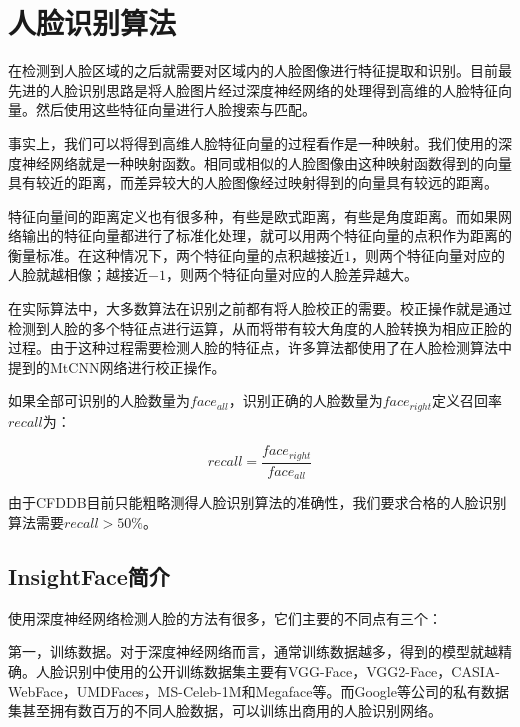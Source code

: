 \chapter{人脸识别算法}
\label{facerecognition}

在检测到人脸区域的之后就需要对区域内的人脸图像进行特征提取和识别。目前最先进的人脸识别思路是将人脸图片经过深度神经网络的处理得到高维的人脸特征向量。然后使用这些特征向量进行人脸搜索与匹配。

事实上，我们可以将得到高维人脸特征向量的过程看作是一种映射。我们使用的深度神经网络就是一种映射函数。相同或相似的人脸图像由这种映射函数得到的向量具有较近的距离，而差异较大的人脸图像经过映射得到的向量具有较远的距离。

特征向量间的距离定义也有很多种，有些是欧式距离，有些是角度距离。而如果网络输出的特征向量都进行了标准化处理，就可以用两个特征向量的点积作为距离的衡量标准。在这种情况下，两个特征向量的点积越接近$1$，则两个特征向量对应的人脸就越相像；越接近$-1$，则两个特征向量对应的人脸差异越大。

在实际算法中，大多数算法在识别之前都有将人脸校正的需要。校正操作就是通过检测到人脸的多个特征点进行运算，从而将带有较大角度的人脸转换为相应正脸的过程。由于这种过程需要检测人脸的特征点，许多算法都使用了在人脸检测算法中提到的MtCNN网络\cite{zhang2016joint}进行校正操作。

如果全部可识别的人脸数量为$face_{all}$，识别正确的人脸数量为$face_{right}$定义召回率$recall$为：

\begin{equation}
\label{eq:rrdef}
recall = \frac{face_{right}}{face_{all}} 
\end{equation}

由于CFDDB目前只能粗略测得人脸识别算法的准确性，我们要求合格的人脸识别算法需要$recall>50\%$。

\section{InsightFace\cite{deng2018arcface}简介}

使用深度神经网络检测人脸的方法有很多，它们主要的不同点有三个：

第一，训练数据。对于深度神经网络而言，通常训练数据越多，得到的模型就越精确。人脸识别中使用的公开训练数据集主要有VGG-Face\cite{parkhi2015deep}，VGG2-Face\cite{cao2017vggface2}，CASIA-WebFace\cite{yi2014learning}，UMDFaces\cite{bansal2017umdfaces}，MS-Celeb-1M\cite{guo2016msceleb}和Megaface\cite{nech2017level}等。而Google等公司的私有数据集甚至拥有数百万的不同人脸数据，可以训练出商用的人脸识别网络。

